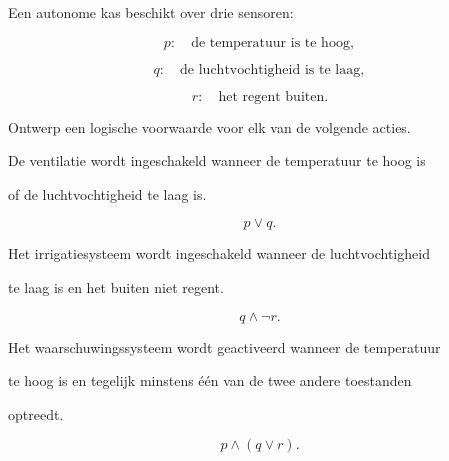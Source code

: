 \documentclass{ximera}
\begin{document}
\begin{oefening}{\oefG}

Een autonome kas beschikt over drie sensoren:

\[
p:\quad \text{de temperatuur is te hoog},
\]

\[
q:\quad \text{de luchtvochtigheid is te laag},
\]

\[
r:\quad \text{het regent buiten}.
\]

Ontwerp een logische voorwaarde voor elk van de volgende acties.

\begin{question}

De ventilatie wordt ingeschakeld wanneer de temperatuur te hoog is

of de luchtvochtigheid te laag is.

\begin{oplossing}

\[
p\lor q.
\]

\end{oplossing}

\end{question}



\begin{question}

Het irrigatiesysteem wordt ingeschakeld wanneer de luchtvochtigheid

te laag is en het buiten niet regent.

\begin{oplossing}

\[
q\land\neg r.
\]

\end{oplossing}

\end{question}



\begin{question}

Het waarschuwingssysteem wordt geactiveerd wanneer de temperatuur

te hoog is en tegelijk minstens één van de twee andere toestanden

optreedt.

\begin{oplossing}

\[
p\land(q\lor r).
\]

\end{oplossing}

\end{question}




\end{oefening}
\end{document}

